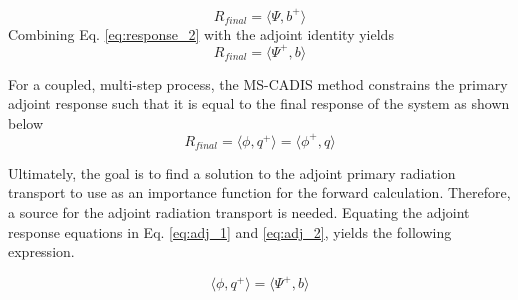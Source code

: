  \begin{equation}\label{eq:response_2}
	 R_{final} = \langle \Psi, b^{+} \rangle 
 \end{equation}
Combining Eq. \ref{eq:response_2} with the adjoint identity yields
 \begin{equation}\label{eq:adj_2}
	 R_{final} %
		=\langle \Psi^{+} , b \rangle
 \end{equation}

For a coupled, multi-step process, the MS-CADIS method 
constrains the primary adjoint response such that it is equal to  
the final response of the system
as shown below
 \begin{equation}\label{eq:adj_1}
	 R_{final} = \langle \phi, q^{+} \rangle =
		\langle \phi^{+} , q \rangle
 \end{equation}

	 
 

Ultimately, the goal is to find a solution to the adjoint
primary radiation transport to use as an importance
function for the forward calculation. Therefore, a
source for the adjoint radiation transport is needed.  Equating the adjoint
response equations in Eq. \ref{eq:adj_1} and \ref{eq:adj_2}, yields the
following expression.

 \begin{equation}\label{eq:adj_src}
	 \langle \phi, q^{+} \rangle =
	 \langle \Psi^{+}, b \rangle
 \end{equation}

